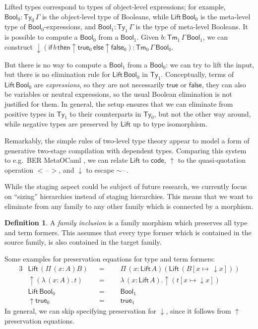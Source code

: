 \documentclass[a4paper,UKenglish,cleveref, autoref, thm-restate]{lipics-v2021}
\theoremstyle{remark}
\theoremstyle{definition}
\newtheorem{mydefinition}{Definition}
\newcommand{\Ty}{\mathsf{Ty}}
\newcommand{\Tm}{\mathsf{Tm}}
\newcommand{\blank}{\mathord{\hspace{1pt}\text{--}\hspace{1pt}}}
\newcommand{\Bool}{\mathsf{Bool}}
\newcommand{\true}{\mathsf{true}}
\newcommand{\false}{\mathsf{false}}
\newcommand{\up}{\uparrow}
\newcommand{\down}{\downarrow}
\newcommand{\Lift}{\mathsf{Lift}}
\begin{document}
Lifted types correspond to types of object-level expressions; for example,
$\Bool_0 : \Ty_0\,\Gamma$ is the object-level type of Booleans, while
$\Lift\,\Bool_0$ is the meta-level type of $\Bool_0$-expressions, and $\Bool_1 :
\Ty_1\,\Gamma$ is the type of meta-level Booleans. It is possible to compute a
$\Bool_0$ from a $\Bool_1$. Given $b : \Tm_1\,\Gamma\,\Bool_1$, we can construct
$\down(\mathsf{if}\,b\,\mathsf{then}\up\!\true_0\,\mathsf{else}\up\!\false_0) :
\Tm_0\,\Gamma\,\Bool_0$.

But there is no way to compute a $\Bool_1$ from a $\Bool_0$: we can try to lift
the input, but there is no elimination rule for $\Lift\,\Bool_0$ in
$\Ty_1$. Conceptually, terms of $\Lift\,\Bool_0$ are \emph{expressions}, so they
are not necessarily $\true$ or $\false$, they can also be variables or neutral
expressions, so the usual Boolean elimination is not justified for them. In
general, the setup ensures that we can eliminate from positive types in $\Ty_1$
to their counterparts in $\Ty_0$, but not the other way around, while negative
types are preserved by $\Lift$ up to type isomorphism.

Remarkably, the simple rules of two-level type theory appear to model a form of
generative two-stage compilation with dependent types. Comparing this system to
e.g.\ BER MetaOCaml \cite{kiselyov14metaocaml}, we can relate $\Lift$ to
$\mathsf{code}$, $\up$ to the quasi-quotation operation $<\!\blank\!>$, and
$\down$ to escape $\sim\!\blank$.

While the staging aspect could be subject of future research, we currently focus
on ``sizing'' hierarchies instead of staging hierarchies. This means that we
want to eliminate from any family to any other family which is connected by
a morphism.

\begin{mydefinition}\label{def:inclusion}
A \emph{family inclusion} is a family morphism which preserves all type and term
formers. This assumes that every type former which is contained in the source
family, is also contained in the target family.
\end{mydefinition}

\noindent Some examples for preservation equations for type and term formers:
\begin{alignat*}{3}
  & \Lift\,(\Pi\,(x : A) B)   && =\,\,\,\,&& \Pi\,(x : \Lift\,A)(\Lift\, (B[x \mapsto\,\down\!x]))\\
  & \up(\lambda\,(x : A).\,t) && =&& \lambda\,(x : \Lift\,A).\up(t[x\mapsto\down\!x])\\
  & \Lift\,\Bool_0            && =&& \Bool_1\\
  & \up\true_0                && =&& \true_1
\end{alignat*}
In general, we can skip specifying preservation for $\down$, since it follows
from $\up$ preservation equations.
\end{document}
